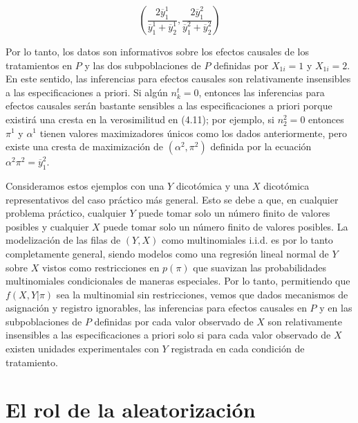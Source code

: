 \documentclass[12pt,a4paper]{article}
\begin{document}
\begin{equation*}
\left( \frac{2\overline{y}_1^1}{\overline{y}_1^1+\overline{y}_2^1}, \frac{2\overline{y}_1^2}{\overline{y}_1^2+\overline{y}_2^2} \right)
\end{equation*} 

Por lo tanto, los datos son informativos sobre los efectos causales de los tratamientos en $P$ y las dos subpoblaciones de $P$ definidas por $X_{1i}=1$ y $X_{1i}=2$. En este sentido, las inferencias para efectos causales son relativamente insensibles a las especificaciones a priori. Si algún $n_k^t = 0$, entonces las inferencias para efectos causales serán bastante sensibles a las especificaciones a priori porque existirá una cresta en la verosimilitud en (4.11); por ejemplo, si $n_2^2 = 0$ entonces $\pi^1$ y $\alpha^1$ tienen valores maximizadores únicos como los dados anteriormente, pero existe una cresta de maximización de $(\alpha^2, \pi^2)$ definida por la ecuación $\alpha^2\pi^2 = \overline{y}_1^2$. 

Consideramos estos ejemplos con una $Y$ dicotómica y una $X$ dicotómica representativos del caso práctico más general.  Esto se debe a que, en cualquier problema práctico, cualquier $Y$ puede tomar solo un número finito de valores posibles y cualquier $X$ puede tomar solo un número finito de valores posibles.  La modelización de las filas de $(Y, X)$ como multinomiales i.i.d. es por lo tanto completamente general, siendo modelos como una regresión lineal normal de $Y$ sobre $X$ vistos como restricciones en $p(\pi)$ que suavizan las probabilidades multinomiales condicionales de maneras especiales. Por lo tanto, permitiendo que $f(X,Y|\pi)$ sea la multinomial sin restricciones, vemos que dados mecanismos de asignación y registro ignorables, las inferencias para efectos causales en $P$ y en las subpoblaciones de $P$ definidas por cada valor observado de $X$ son relativamente insensibles a las especificaciones a priori solo si para cada valor observado de $X$ existen unidades experimentales con $Y$ registrada en cada condición de tratamiento. 

\section{El rol de la aleatorización}
\end{document}
